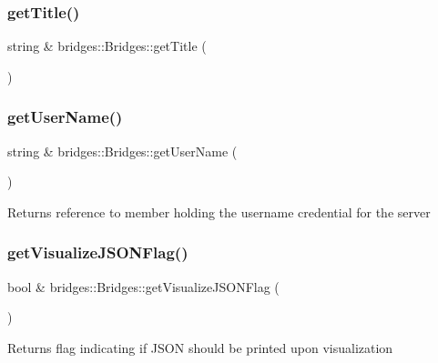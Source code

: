 \subsubsection{\texorpdfstring{get\+Title()}{getTitle()}}
{\footnotesize\ttfamily string \& bridges\+::\+Bridges\+::get\+Title (\begin{DoxyParamCaption}{ }\end{DoxyParamCaption})}

\mbox{\label{namespacebridges_1_1_bridges_a42a3ba0cabb00b91fd293a2009e9d775}} 
\subsubsection{\texorpdfstring{get\+User\+Name()}{getUserName()}}
{\footnotesize\ttfamily string \& bridges\+::\+Bridges\+::get\+User\+Name (\begin{DoxyParamCaption}{ }\end{DoxyParamCaption})}

\begin{DoxyReturn}{Returns}
reference to member holding the username credential for the server 
\end{DoxyReturn}
\mbox{\label{namespacebridges_1_1_bridges_af7949cda24c8590151637970f555a2f5}} 
\subsubsection{\texorpdfstring{get\+Visualize\+J\+S\+O\+N\+Flag()}{getVisualizeJSONFlag()}}
{\footnotesize\ttfamily bool \& bridges\+::\+Bridges\+::get\+Visualize\+J\+S\+O\+N\+Flag (\begin{DoxyParamCaption}{ }\end{DoxyParamCaption})}

\begin{DoxyReturn}{Returns}
flag indicating if J\+S\+ON should be printed upon visualization 
\end{DoxyReturn}
\mbox{\label{namespacebridges_1_1_bridges_a10272250ed6f4bb8281dcaecc61fa698}} 
